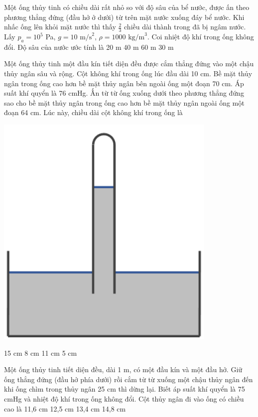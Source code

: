 \documentclass[12pt,a4paper]{article}
\begin{document}
\begin{ex}
	Một ống thủy tinh có chiều dài rất nhỏ so với độ sâu của bể nước, được ấn theo phương thẳng đứng (đầu hở ở dưới) từ trên mặt nước xuống đáy bể nước. Khi nhấc ống lên khỏi mặt nước thì thấy $\frac{2}{3}$ chiều dài thành trong đã bị ngâm nước. Lấy $p_a = 10^5$ Pa, $g=10 \text{ m/s}^2$, $\rho = 1000 \text{ kg/m}^3$. Coi nhiệt độ khí trong ống không đổi. Độ sâu của nước ước tính là
	\choice
	{20 m}
	{40 m}
	{60 m}
	{30 m}
\end{ex}

\begin{ex}
	Một ống thủy tinh một đầu kín tiết diện đều được cắm thẳng đứng vào một chậu thủy ngân sâu và rộng. Cột không khí trong ống lúc đầu dài 10 cm. Bề mặt thủy ngân trong ống cao hơn bề mặt thủy ngân bên ngoài ống một đoạn 70 cm. Áp suất khí quyển là 76 cmHg. Ấn từ từ ống xuống dưới theo phương thẳng đứng sao cho bề mặt thủy ngân trong ống cao hơn bề mặt thủy ngân ngoài ống một đoạn 64 cm. Lúc này, chiều dài cột không khí trong ống là
		\begin{center}
		\includegraphics[scale=0.3]{img/8.png}
	\end{center}
	\choice
	{15 cm}
	{8 cm}
	{11 cm}
	{5 cm}
\end{ex}

\begin{ex}
	Một ống thủy tinh tiết diện đều, dài 1 m, có một đầu kín và một đầu hở. Giữ ống thẳng đứng (đầu hở phía dưới) rồi cắm từ từ xuống một chậu thủy ngân đến khi ống chìm trong thủy ngân 25 cm thì dừng lại. Biết áp suất khí quyển là 75 cmHg và nhiệt độ khí trong ống không đổi. Cột thủy ngân đi vào ống có chiều cao là
	\choice
	{11,6 cm}
	{12,5 cm}
	{13,4 cm}
	{14,8 cm}
\end{ex}
\end{document}

